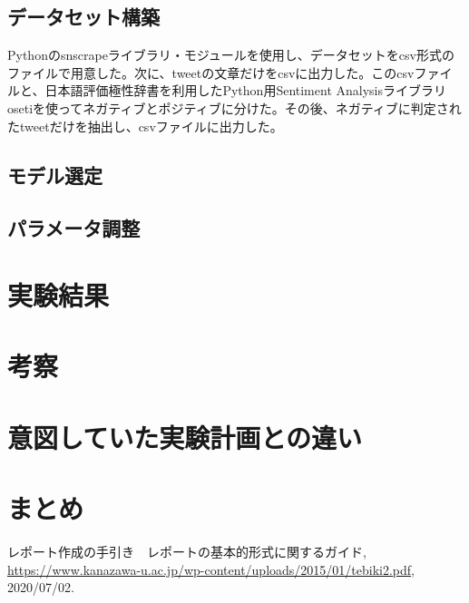 \documentclass[a4paper, 11pt, titlepage]{jsarticle}
\begin{document}
\subsection{データセット構築}
Pythonのsnscrapeライブラリ・モジュールを使用し、データセットをcsv形式のファイルで用意した。次に、tweetの文章だけをcsvに出力した。このcsvファイルと、日本語評価極性辞書を利用したPython用Sentiment Analysisライブラリosetiを使ってネガティブとポジティブに分けた。その後、ネガティブに判定されたtweetだけを抽出し、csvファイルに出力した。

\subsection{モデル選定}


\subsection{パラメータ調整}


\section{実験結果}


\section{考察}


\section{意図していた実験計画との違い}


\section{まとめ}


\begin{thebibliography}{n}
  レポート作成の手引き　レポートの基本的形式に関するガイド, \url{https://www.kanazawa-u.ac.jp/wp-content/uploads/2015/01/tebiki2.pdf}, 2020/07/02.

\end{thebibliography}
\end{document}
